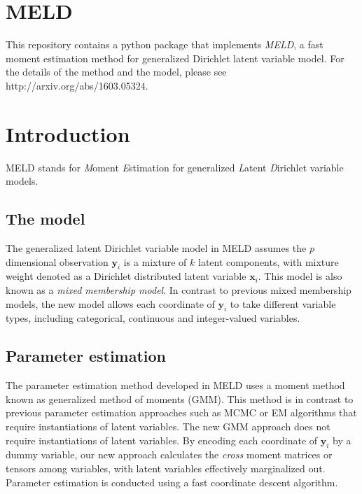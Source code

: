 \documentclass[]{article}
\date{}
\begin{document}
\section{MELD}\label{meld}

This repository contains a python package that implements \emph{MELD}, a
fast moment estimation method for generalized Dirichlet latent variable
model. For the details of the method and the model, please see
http://arxiv.org/abs/1603.05324.

\section{Introduction}\label{introduction}

MELD stands for \emph{M}oment \emph{E}stimation for generalized
\emph{L}atent \emph{D}irichlet variable models.

\subsection{The model}\label{the-model}

The generalized latent Dirichlet variable model in MELD assumes the
$p$ dimensional observation $\boldsymbol{y}_i$
is a mixture of $k$ latent components, with mixture weight denoted
as a Dirichlet distributed latent variable $\boldsymbol{x}_i$.
This model is also known as a \emph{mixed membership model}. In contrast
to previous mixed membership models, the new model allows each
coordinate of $\boldsymbol{y}_i$ to take different variable
types, including categorical, continuous and integer-valued variables.

\subsection{Parameter estimation}\label{parameter-estimation}

The parameter estimation method developed in MELD uses a moment method
known as generalized method of moments (GMM). This method is in contrast
to previous parameter estimation approaches such as MCMC or EM
algorithms that require instantiations of latent variables. The new GMM
approach does not require instantiations of latent variables. By
encoding each coordinate of $\boldsymbol{y}_i$ by a dummy
variable, our new approach calculates the \emph{cross} moment matrices
or tensors among variables, with latent variables effectively
marginalized out. Parameter estimation is conducted using a fast
coordinate descent algorithm.
\end{document}
